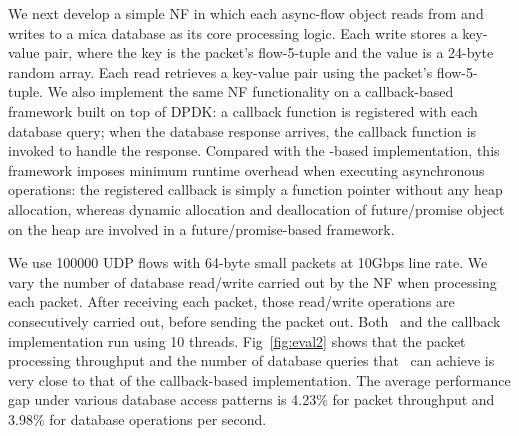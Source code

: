 We next develop a simple NF in which each async-flow object reads from and writes to a mica database as its core processing logic. Each write stores a key-value pair, where the key is the packet's flow-5-tuple and the value is a 24-byte random array. Each read retrieves a key-value pair using the packet's flow-5-tuple. We also implement the same NF functionality on a callback-based framework built on top of DPDK: a callback function is registered with each database query; when the database response arrives, the callback function is invoked to handle the response. Compared with the \netstar-based implementation, this framework imposes minimum runtime overhead when executing asynchronous operations: the registered callback is simply a function pointer without any heap allocation, whereas dynamic allocation and deallocation of future/promise object on the heap are involved in a future/promise-based framework.


We use 100000 UDP flows with 64-byte small packets at 10Gbps line rate. We vary the number of database read/write carried out by the NF when processing each packet. After receiving each packet, those read/write operations are consecutively carried out, before sending the packet out. Both \netstar~and the callback implementation run using 10 threads.
Fig~\ref{fig:eval2} shows that the packet processing throughput and the number of database queries that \netstar~can achieve is very close to that of the callback-based implementation. The average performance gap under various database access patterns is 4.23\% for packet throughput and 3.98\% for database operations per second.


